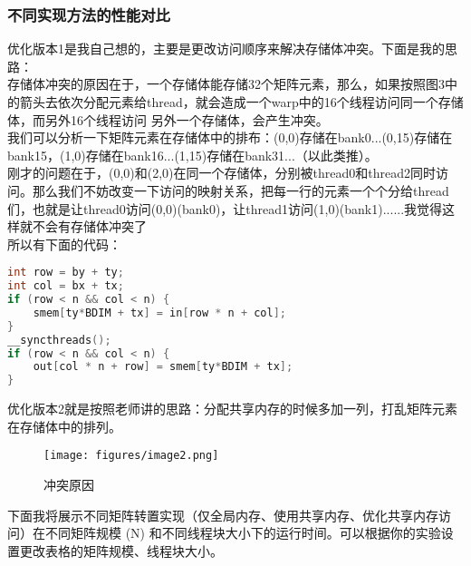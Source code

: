 \documentclass{SYSUReport}
\begin{document}
\subsubsection{不同实现方法的性能对比}
优化版本1是我自己想的，主要是更改访问顺序来解决存储体冲突。下面是我的思路：\\
存储体冲突的原因在于，一个存储体能存储32个矩阵元素，那么，如果按照图3中的箭头去依次分配元素给thread，就会造成一个warp中的16个线程访问同一个存储体，而另外16个线程访问
另外一个存储体，会产生冲突。\\
我们可以分析一下矩阵元素在存储体中的排布：(0,0)存储在bank0...(0,15)存储在bank15，(1,0)存储在bank16...(1,15)存储在bank31...（以此类推）。\\
刚才的问题在于，(0,0)和(2,0)在同一个存储体，分别被thread0和thread2同时访问。那么我们不妨改变一下访问的映射关系，把每一行的元素一个个分给thread们，也就是让thread0访问(0,0)(bank0)，让thread1访问(1,0)(bank1)......我觉得这样就不会有存储体冲突了\\
所以有下面的代码：\\
\begin{lstlisting}[language=c]
int row = by + ty;
int col = bx + tx;
if (row < n && col < n) {
    smem[ty*BDIM + tx] = in[row * n + col];
}
__syncthreads();
if (row < n && col < n) {
    out[col * n + row] = smem[ty*BDIM + tx];
}    
\end{lstlisting}
优化版本2就是按照老师讲的思路：分配共享内存的时候多加一列，打乱矩阵元素在存储体中的排列。\\
\begin{figure}
    \centering
    \texttt{[image: figures/image2.png]}
    \caption{冲突原因}
    \label{fig:trans}
\end{figure}
下面我将展示不同矩阵转置实现（仅全局内存、使用共享内存、优化共享内存访问）在不同矩阵规模 (N) 和不同线程块大小下的运行时间。可以根据你的实验设置更改表格的矩阵规模、线程块大小。
\end{document}

